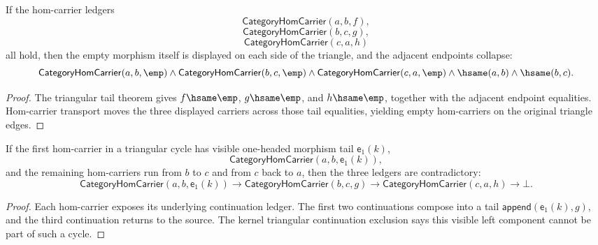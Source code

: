 \begin{theorem}
\label{thm:category-hom-carrier-triangle-cycle-empty-hom-exactness}
If the hom-carrier ledgers
$$
\mathsf{CategoryHomCarrier}(a,b,f),
$$
$$
\mathsf{CategoryHomCarrier}(b,c,g),
$$
$$
\mathsf{CategoryHomCarrier}(c,a,h)
$$
all hold, then the empty morphism itself is displayed on each side of the
triangle, and the adjacent endpoints collapse:
$$
\mathsf{CategoryHomCarrier}(a,b,\emp)\land
\mathsf{CategoryHomCarrier}(b,c,\emp)\land
\mathsf{CategoryHomCarrier}(c,a,\emp)\land
\hsame(a,b)\land
\hsame(b,c).
$$
\end{theorem}
\begin{proof}
The triangular tail theorem gives $f\hsame\emp$, $g\hsame\emp$, and
$h\hsame\emp$, together with the adjacent endpoint equalities. Hom-carrier
transport moves the three displayed carriers across those tail equalities,
yielding empty hom-carriers on the original triangle edges.
\end{proof}

\begin{theorem}
\label{thm:category-hom-carrier-e1-morphism-triangle-cycle-absurd}
If the first hom-carrier in a triangular cycle has visible one-headed morphism
tail $\mathsf{e}_1(k)$,
$$
\mathsf{CategoryHomCarrier}(a,b,\mathsf{e}_1(k)),
$$
and the remaining hom-carriers run from $b$ to $c$ and from $c$ back to $a$,
then the three ledgers are contradictory:
$$
\mathsf{CategoryHomCarrier}(a,b,\mathsf{e}_1(k))
\to
\mathsf{CategoryHomCarrier}(b,c,g)
\to
\mathsf{CategoryHomCarrier}(c,a,h)
\to
\bot.
$$
\end{theorem}
\begin{proof}
Each hom-carrier exposes its underlying continuation ledger. The first two
continuations compose into a tail $\mathsf{append}(\mathsf{e}_1(k),g)$, and
the third continuation returns to the source. The kernel triangular continuation
exclusion says this visible left component cannot be part of such a cycle.
\end{proof}

